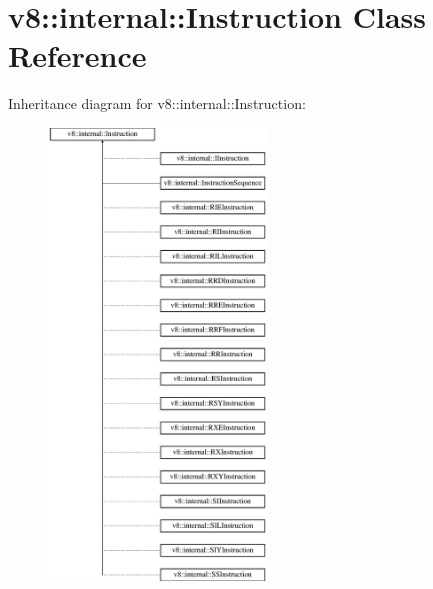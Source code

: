 \hypertarget{classv8_1_1internal_1_1_instruction}{}\section{v8\+:\+:internal\+:\+:Instruction Class Reference}
\label{classv8_1_1internal_1_1_instruction}
Inheritance diagram for v8\+:\+:internal\+:\+:Instruction\+:\begin{figure}[H]
\begin{center}
\leavevmode
\includegraphics[height=12.000000cm]{classv8_1_1internal_1_1_instruction}
\end{center}
\end{figure}
